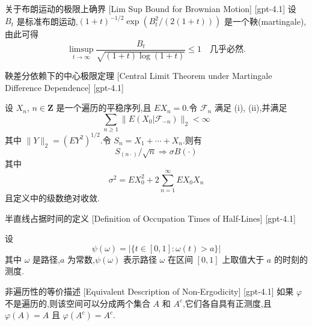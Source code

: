 \documentclass[UTF8]{ctexart}
\begin{document}
    
    
    \begin{thm}
        {关于布朗运动的极限上确界}
        [Lim Sup Bound for Brownian Motion]
        [gpt-4.1]
        设 $B_t$ 是标准布朗运动,$( 1 + t )^{-1/2} \exp ( B_{t}^{2} / ( 2 ( 1 + t ) ) )$ 是一个鞅(martingale),由此可得
\[
\limsup_{t \to \infty} \frac{B_t}{\sqrt{(1 + t)\log(1 + t)}} \leq 1 \quad \text{几乎必然}.
\]

    \end{thm}
    
    
    
    \begin{thm}
        {鞅差分依赖下的中心极限定理}
        [Central Limit Theorem under Martingale Difference Dependence]
        [gpt-4.1]
        
设 $X_{n}$, $n \in \mathbf{Z}$ 是一个遍历的平稳序列,且 $E X_{n} = 0$.令 $\mathcal{F}_{n}$ 满足 (i), (ii),并满足
\[
\sum_{n \geq 1} \| E ( X_{0} | \mathcal{F}_{-n} ) \|_{2} < \infty
\]
其中 $\| Y \|_{2} = ( E Y^{2} )^{1/2}$.令 $S_{n} = X_{1} + \cdots + X_{n}$.则有
\[
S_{(n \cdot)}/\sqrt{n} \Rightarrow \sigma B(\cdot)
\]
其中
\[
\sigma^{2} = E X_{0}^{2} + 2 \sum_{n=1}^{\infty} E X_{0} X_{n}
\]
且定义中的级数绝对收敛.

    \end{thm}
    
    
    
    \begin{dfn}
        {半直线占据时间的定义}
        [Definition of Occupation Times of Half-Lines]
        [gpt-4.1]
        
设
\[
\psi(\omega) = |\{t \in [0, 1] : \omega(t) > a\}|
\]
其中 $\omega$ 是路径,$a$ 为常数,$\psi(\omega)$ 表示路径 $\omega$ 在区间 $[0, 1]$ 上取值大于 $a$ 的时刻的测度.

    \end{dfn}
    
    
    
    \begin{thm}
        {非遍历性的等价描述}
        [Equivalent Description of Non-Ergodicity]
        [gpt-4.1]
        如果 $\varphi$ 不是遍历的,则该空间可以分成两个集合 $A$ 和 $A^{c}$,它们各自具有正测度,且 $\varphi(A) = A$ 且 $\varphi(A^{c}) = A^{c}$.
    \end{thm}
    
\end{document}
